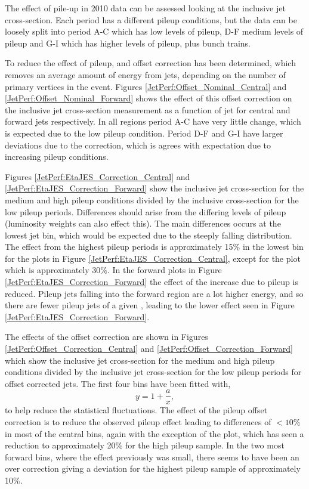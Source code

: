 The effect of pile-up in 2010 data can be assessed looking at the inclusive jet cross-section.
Each period has a different pileup conditions, but the data can be loosely split into period A-C which has low levels of pileup, D-F medium levels of pileup and G-I which has higher levels of pileup, plus bunch trains.


To reduce the effect of pileup, and offset correction has been determined, which removes an average amount of energy from jets, depending on the number of primary vertices in the event.
Figures \ref{JetPerf:Offset_Nominal_Central} and \ref{JetPerf:Offset_Nominal_Forward} shows the effect of this offset correction on the inclusive jet cross-section measurement as a function of jet \pt{} for central and forward jets respectively.
In all regions period A-C have very little change, which is expected due to the low pileup condition.
Period D-F and G-I have larger deviations due to the correction, which is agrees with expectation due to increasing pileup conditions.


Figures \ref{JetPerf:EtaJES_Correction_Central} and \ref{JetPerf:EtaJES_Correction_Forward} show the inclusive jet cross-section for the medium and high pileup conditions divided by the inclusive cross-section for the low pileup periods. 
Differences should arise from the differing levels of pileup (luminosity weights can also effect this).  
The main differences occurs at the lowest jet \pt{} bin, which would be expected due to the steeply falling \pt{} distribution.
The effect from the highest pileup periods is approximately 15\% in the lowest \pt{} bin for the plots in Figure \ref{JetPerf:EtaJES_Correction_Central}, except for the  plot which is approximately 30\%.
In the forward plots in Figure \ref{JetPerf:EtaJES_Correction_Forward} the effect of the increase due to pileup is reduced.
Pileup jets falling into the forward region are a lot higher energy, and so there are fewer pileup jets of a given \pt{}, leading to the lower effect seen in Figure \ref{JetPerf:EtaJES_Correction_Forward}.


The effects of the offset correction are shown in Figures \ref{JetPerf:Offset_Correction_Central} and \ref{JetPerf:Offset_Correction_Forward} which show the inclusive jet cross-section for the medium and high pileup conditions divided by the inclusive jet cross-section for the low pileup periods for offset corrected jets. 
The first four bins have been fitted with,
\begin{equation}
y =1 + \frac{a}{x},
\label{JetPerf:BinFit}
\end{equation}
to help reduce the statistical fluctuations.
The effect of the pileup offset correction is to reduce the observed pileup effect leading to differences of $<10\%$ in most of the central bins, again with the exception of the  plot, which has seen a reduction to approximately 20\% for the high pileup sample. 
In the two most forward bins, where the effect previously was small, there seems to have been an over correction giving a deviation for the highest pileup sample of approximately 10\%. 

